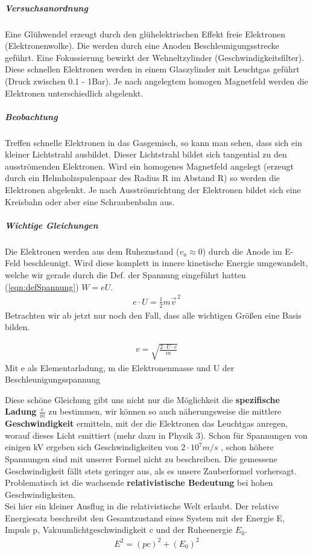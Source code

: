 \subparagraph{Versuchsanordnung} Eine Glühwendel erzeugt durch den glühelektrischen Effekt freie Elektronen (Elektronenwolke). Die werden durch eine Anoden Beschleunigungsstrecke geführt. Eine Fokussierung bewirkt der Wehneltzylinder (Geschwindigkeitsfilter).
Diese schnellen Elektronen werden in einem Glaszylinder mit Leuchtgas geführt (Druck zwischen 0.1 - 1Bar). Je nach angelegtem homogen Magnetfeld werden die Elektronen unterschiedlich abgelenkt. 
\subparagraph{Beobachtung}Treffen schnelle Elektronen in das Gasgemisch, so kann man sehen, dass sich ein kleiner Lichtstrahl ausbildet.
Dieser Lichtstrahl  bildet sich tangential zu den ausströmenden Elektronen. Wird ein homogenes Magnetfeld angelegt (erzeugt durch ein Helmholzspulenpaar des Radius R im Abstand R) so werden die Elektronen abgelenkt.
Je nach Ausströmrichtung der Elektronen bildet sich eine Kreisbahn oder aber eine Schraubenbahn aus. 
\subparagraph{Wichtige Gleichungen}
Die Elektronen werden aus dem Ruhezustand ($v_a \approx 0$) durch die Anode im E-Feld beschleunigt. Wird diese komplett in innere kinetische Energie umgewandelt, welche wir gerade durch die Def. der Spannung eingeführt hatten (\ref{eqn:defSpannung}) $W = e  U $.
\begin{align*}
\boxed{e \cdot U = \frac{1}{2}m \vec{v}^{\, 2}}
\end{align*} Betrachten wir ab jetzt nur noch den Fall, dass alle wichtigen Größen eine Basis bilden. \par 
\begin{align} \label{eqn:ElektronenFadenstrahlGeschw}
v = \sqrt{\frac{2 \cdot U \cdot e}{m}}
\end{align}Mit e als Elementarladung, m die Elektronenmasse und U der Beschleunigungsspannung

Diese schöne Gleichung gibt uns nicht nur die Möglichkeit die\textbf{ spezifische Ladung} $\tfrac{e}{m}$ zu bestimmen, wir können so auch näherungsweise die mittlere \textbf{Geschwindigkeit} ermitteln, mit der die Elektronen das Leuchtgas anregen, worauf dieses Licht emittiert (mehr dazu in Physik 3). Schon für Spannungen von einigen kV ergeben sich Geschwindigkeiten von $2 \cdot 10^{7} m/s$ , schon höhere Spannungen sind mit unserer Formel nicht zu beschreiben.
Die gemessene Geschwindigkeit fällt stets geringer aus, als es unsere Zauberformel vorhersagt.  Problematisch ist die wachsende \textbf{relativistische Bedeutung} bei hohen Geschwindigkeiten.
\\ Sei hier ein kleiner Ausflug in die relativistische Welt erlaubt. Der relative Energiesatz beschreibt den Gesamtzustand eines System mit der Energie E, Impuls p, Vakuumlichtgeschwindigkeit c und der Ruheenergie $E_0$.
\begin{align} \label{eqn:relEnergiesatz}
E^2 = (pc)^2 + (E_0)^2
\end{align}


